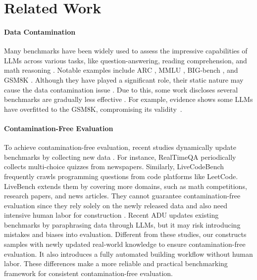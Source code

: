 \section{Related Work}
    \paragraph{Data Contamination}
        Many benchmarks have been widely used to assess the impressive capabilities of LLMs
        across various tasks, like question-answering, reading comprehension, and math reasoning
        \cite{pan2023fact,pan2024fallacy,zhou2024rulearena,wu2025sailing,zhao2025survey}.
        Notable examples include ARC \cite{clark2018think}, MMLU \cite{hendrycks2021mmlu}, BIG-bench \cite{srivastava2022bigbench}, and GSM8K \cite{cobbe2021gsm8k}.
        Although they have played a significant role,
        their static nature may cause the data contamination issue \cite{magar2022data,yang2023rethinking,golchin2023data,jacovi2023stop,li2023open,oren2023proving,sainz2023nlp,ni2024training}.
        Due to this,
        some work discloses several benchmarks are gradually less effective 
        \cite{schaeffer2023pretraining,zhou2023don}.
        For example, evidence shows some LLMs have overfitted to the GSM8K, compromising its validity~\cite{zhang2024careful}.

    \paragraph{Contamination-Free Evaluation}
        To achieve contamination-free evaluation, recent studies dynamically update benchmarks by collecting new data \cite{zhu2023dyval,thrush2022dynatask,qian2024varbench,srivastava2024functional}.
        For instance, RealTimeQA \cite{kasai2023realtime} periodically collects multi-choice quizzes from newspapers.
        Similarly, LiveCodeBench \cite{jain2024livecodebench} frequently crawls programming questions from code platforms like LeetCode.
        LiveBench \cite{white2024livebench} extends them
        by covering more domains, such as math competitions, research papers, and news articles.
        They cannot guarantee contamination-free evaluation since they rely solely on the newly released data
        and also need intensive human labor for construction \cite{liska2022streamingqa,mousavi2024dyknow}.
        Recent ADU \cite{ying2024automating} updates existing benchmarks by paraphrasing data through LLMs, but it may risk introducing mistakes and biases into evaluation.
        Different from these studies,
        our \benchname constructs samples with newly updated real-world knowledge to ensure contamination-free evaluation.
        It also introduces a fully automated building workflow without human labor.
        These differences make \benchname a more reliable and practical benchmarking framework for consistent contamination-free evaluation.

